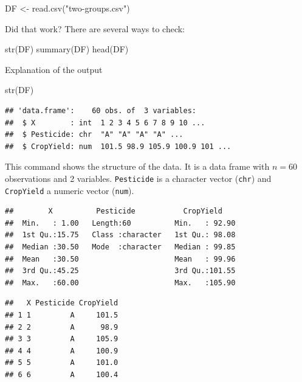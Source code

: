 \documentclass[
]{book}
\newenvironment{Shaded}{\begin{snugshade}}{\end{snugshade}}
\newcommand{\FunctionTok}[1]{\textcolor[rgb]{0.00,0.00,0.00}{#1}}
\newcommand{\NormalTok}[1]{#1}
\newcommand{\OtherTok}[1]{\textcolor[rgb]{0.56,0.35,0.01}{#1}}
\newcommand{\StringTok}[1]{\textcolor[rgb]{0.31,0.60,0.02}{#1}}
\begin{document}
\begin{Shaded}
\begin{Highlighting}[]
\NormalTok{DF }\OtherTok{\textless{}{-}} \FunctionTok{read.csv}\NormalTok{(}\StringTok{"two{-}groups.csv"}\NormalTok{)}
\end{Highlighting}
\end{Shaded}

Did that work? There are several ways to check:

\begin{Shaded}
\begin{Highlighting}[]
\FunctionTok{str}\NormalTok{(DF)}
\FunctionTok{summary}\NormalTok{(DF)}
\FunctionTok{head}\NormalTok{(DF)}
\end{Highlighting}
\end{Shaded}

Explanation of the output

\begin{Shaded}
\begin{Highlighting}[]
\FunctionTok{str}\NormalTok{(DF)}
\end{Highlighting}
\end{Shaded}

\begin{verbatim}
## 'data.frame':    60 obs. of  3 variables:
##  $ X        : int  1 2 3 4 5 6 7 8 9 10 ...
##  $ Pesticide: chr  "A" "A" "A" "A" ...
##  $ CropYield: num  101.5 98.9 105.9 100.9 101 ...
\end{verbatim}

This command shows the structure of the data. It is a data frame with \(n = 60\) observations and 2 variables. \texttt{Pesticide} is a character vector (\texttt{chr}) and \texttt{CropYield} a numeric vector (\texttt{num}).

\begin{verbatim}
##        X          Pesticide           CropYield     
##  Min.   : 1.00   Length:60          Min.   : 92.90  
##  1st Qu.:15.75   Class :character   1st Qu.: 98.08  
##  Median :30.50   Mode  :character   Median : 99.85  
##  Mean   :30.50                      Mean   : 99.96  
##  3rd Qu.:45.25                      3rd Qu.:101.55  
##  Max.   :60.00                      Max.   :105.90
\end{verbatim}

\begin{verbatim}
##   X Pesticide CropYield
## 1 1         A     101.5
## 2 2         A      98.9
## 3 3         A     105.9
## 4 4         A     100.9
## 5 5         A     101.0
## 6 6         A     100.4
\end{verbatim}
\end{document}
